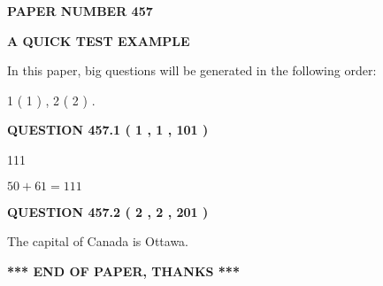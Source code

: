 \documentclass[12pt]{article}
\begin{document}
   
   
   
 {\textbf{ \Large{ PAPER NUMBER  457  }}}
   
   
\vspace{0.2in}
   
   
   
   
   
   
 \vspace{0.2in}
{\LARGE {\textbf{ A QUICK TEST EXAMPLE}}}
   
   
   
\vspace{0.2in}
   
In this paper, big questions will be generated in the following order: 
   
   
   1 ( 1 )
 ,
   2 ( 2 )
 .
  
\vspace{0.2in}
  
{\textbf{\Large{QUESTION
457.1 
 ( 1 , 1 , 101 )
}}}
  
  
 
 
\noindent{}

111
 
 
 
 
\noindent{}

$ %
50 +  %
61=   %
111$
 
 
  
\vspace{0.2in}
  
{\textbf{\Large{QUESTION
457.2 
 ( 2 , 2 , 201 )
}}}
  
  
 
 
\noindent{}
 
 
The capital of Canada is Ottawa.
 
 
 
 
   
   
 \vspace{0.2in}
 
   
   
   
   
\vspace{1.0in} 
{\textbf{\large{ *** END OF PAPER, THANKS *** }}} 
   
\end{document}
